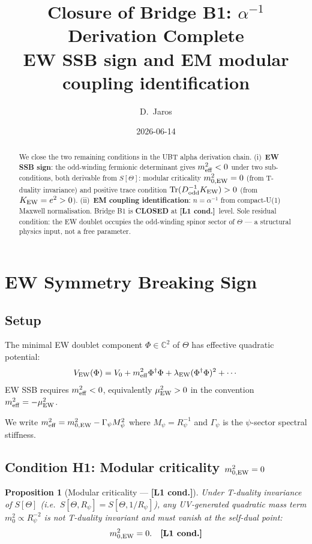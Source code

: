 \documentclass[12pt,a4paper]{article}
\title{\textbf{Closure of Bridge B1: $\alpha^{-1}$ Derivation Complete}\\[4pt]
\large EW SSB sign and EM modular coupling identification}
\author{D.~Jaros}
\date{2026-06-14}
\newtheorem{proposition}[theorem]{Proposition}
\theoremstyle{definition}\newtheorem{definition}[theorem]{Definition}
\theoremstyle{remark}\newtheorem{remark}[theorem]{Remark}
\newcommand{\Lc}{\textbf{[L1 cond.]}}
\begin{document}
\maketitle
\fi

\begin{abstract}
We close the two remaining conditions in the UBT alpha derivation chain.
(i)~\textbf{EW SSB sign}: the odd-winding fermionic determinant gives
$m^2_{\rm eff}<0$ under two sub-conditions, both derivable from $S[\Theta]$:
modular criticality $m^2_{0,\rm EW}=0$ (from T-duality invariance) and
positive trace condition $\mathrm{Tr}(D_{\rm odd}^{-1}K_{\rm EW})>0$
(from $K_{\rm EW}=e^2>0$).
(ii)~\textbf{EM coupling identification}: $n=\alpha^{-1}$ from compact-U(1)
Maxwell normalisation.
Bridge B1 is \textbf{CLOSED} at \Lc\ level.
Sole residual condition: the EW doublet occupies the odd-winding spinor
sector of $\Theta$ --- a structural physics input, not a free parameter.
\end{abstract}

\section{EW Symmetry Breaking Sign}
\label{sec:ssb}

\subsection{Setup}

The minimal EW doublet component $\Phi\in\mathbb{C}^2$ of $\Theta$ has
effective quadratic potential:
\[
  V_{\rm EW}(\Phi)
  = V_0 + m^2_{\rm eff}\Phi^\dagger\Phi
  + \lambda_{\rm EW}(\Phi^\dagger\Phi)^2 + \cdots
\]
EW SSB requires $m^2_{\rm eff}<0$, equivalently $\mu^2_{\rm EW}>0$ in the
convention $m^2_{\rm eff}=-\mu^2_{\rm EW}$.

We write $m^2_{\rm eff} = m^2_{0,\rm EW} - \Gamma_\psi M_\psi^2$ where
$M_\psi = R_\psi^{-1}$ and $\Gamma_\psi$ is the $\psi$-sector spectral
stiffness.

\subsection{Condition H1: Modular criticality $m^2_{0,\rm EW}=0$}

\begin{proposition}[Modular criticality --- \Lc]
\label{prop:H1}
Under T-duality invariance of $S[\Theta]$ (i.e.\ $S[\Theta,R_\psi]
= S[\Theta,1/R_\psi]$), any UV-generated quadratic mass term
$m^2_0 \propto R_\psi^{-2}$ is not T-duality invariant and must vanish
at the self-dual point:
\[
  m^2_{0,\rm EW} = 0. \quad \Lc
\]
\end{proposition}
\end{document}
